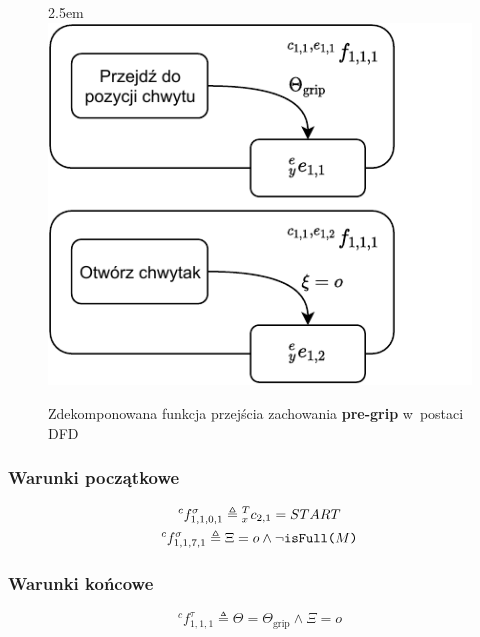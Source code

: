 \begin{figure}[ht]
    \leftskip2.5em
    \includegraphics[width=\columnwidth]{figures/ISR-cs-fp-pre-grip.pdf}
    \caption{Zdekomponowana funkcja przejścia zachowania \textbf{pre-grip} w~postaci DFD}
    \label{fig:cs-fp-pre-grip}
\end{figure}

\subsubsection{Warunki początkowe}
\begin{equation}
    \begin{gathered}
        {}^{c}f^{\sigma}_{1,1,0,1} \triangleq {}^{T}_{x}c_{2,1} = START\\
        {}^{c}f^{\sigma}_{1,1,7,1} \triangleq \Xi = o \land \neg \text{\texttt{isFull($M$)}}
    \end{gathered}
\end{equation}

\subsubsection{Warunki końcowe}
\begin{equation}
    {}^{c}f^{\tau}_{1,1,1} \triangleq \Theta = \Theta_{\mathrm{grip}} \land \Xi = o
\end{equation}


